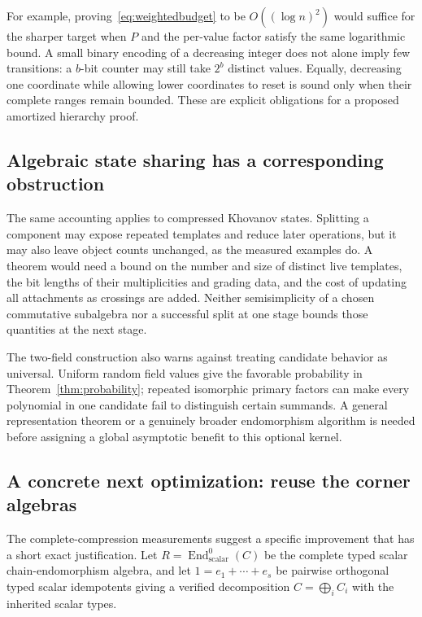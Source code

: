 \documentclass[11pt,a4paper]{article}
\theoremstyle{definition}\newtheorem{definition}[theorem]{Definition}
\theoremstyle{remark}\newtheorem{remark}[theorem]{Remark}
\newcommand{\End}{\operatorname{End}}
\begin{document}
For example, proving~\eqref{eq:weightedbudget} to be
$O((\log n)^2)$ would suffice for the sharper target when $P$ and the
per-value factor satisfy the same logarithmic bound. A small binary
encoding of a decreasing integer does not alone imply few transitions:
a $b$-bit counter may still take $2^b$ distinct values. Equally, decreasing
one coordinate while allowing lower coordinates to reset is sound only
when their complete ranges remain bounded. These are explicit obligations
for a proposed amortized hierarchy proof.

\subsection{Algebraic state sharing has a corresponding obstruction}

The same accounting applies to compressed Khovanov states. Splitting a
component may expose repeated templates and reduce later operations, but
it may also leave object counts unchanged, as the measured examples do.
A theorem would need a bound on the number and size of distinct live
templates, the bit lengths of their multiplicities and grading data, and
the cost of updating all attachments as crossings are added. Neither
semisimplicity of a chosen commutative subalgebra nor a successful split at
one stage bounds those quantities at the next stage.

The two-field construction also warns against treating candidate behavior
as universal. Uniform random field values give the favorable probability
in Theorem~\ref{thm:probability}; repeated isomorphic primary factors can
make every polynomial in one candidate fail to distinguish certain
summands. A general representation theorem or a genuinely broader
endomorphism algorithm is needed before assigning a global asymptotic
benefit to this optional kernel.

\subsection{A concrete next optimization: reuse the corner algebras}

The complete-compression measurements suggest a specific improvement that
has a short exact justification. Let $R=\End^0_{\mathrm{scalar}}(C)$ be the
complete typed scalar chain-endomorphism algebra, and let
$1=e_1+\cdots+e_s$ be pairwise orthogonal typed scalar idempotents giving a
verified decomposition $C=\bigoplus_i C_i$ with the inherited scalar types.
\end{document}

